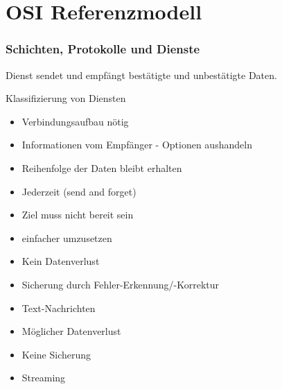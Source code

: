 \section{OSI Referenzmodell}
    \subsubsection{Schichten, Protokolle und Dienste}
    \begin{definition}{Dienst}
        sendet und empfängt bestätigte und unbestätigte Daten.
    \end{definition}
    \begin{highlight}{Klassifizierung von Diensten}
    \begin{center}
        \begin{minipage}{0.46\linewidth}
                    \begin{itemize}
                        \item Verbindungsaufbau nötig
                        \item Informationen vom Empfänger - Optionen aushandeln
                        \item Reihenfolge der Daten bleibt erhalten
                    \end{itemize}
                \begin{itemize}
                    \item Jederzeit (send and forget)
                    \item Ziel muss nicht bereit sein
                    \item einfacher umzusetzen
                \end{itemize}
                
        \end{minipage}
        \hfill\vline\hfill
        \begin{minipage}{0.47\linewidth}
                \begin{itemize}
                    \item Kein Datenverlust
                    \item Sicherung durch Fehler-Erkennung/-Korrektur
                    \item Text-Nachrichten
                \end{itemize}
            \begin{itemize}
                \item Möglicher Datenverlust
                \item Keine Sicherung
                \item Streaming
            \end{itemize}
        \end{minipage}
    \end{center}
\end{highlight}

